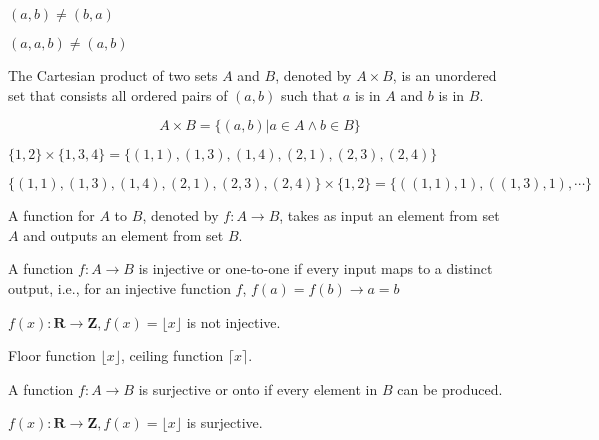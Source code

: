 \begin{ex}
$(a, b) \neq (b, a)$
\end{ex}

\begin{ex}
$(a, a, b) \neq (a, b)$
\end{ex}

\begin{defn}
The Cartesian product of two sets $A$ and $B$, denoted by $A \times B$, is an unordered set that consists all ordered pairs of $(a, b)$ such that $a$ is in $A$ and $b$ is in $B$.

$$A \times B = \{ (a, b) | a \in A \land b \in B\}$$
\end{defn}

\begin{ex}
$\{1, 2\} \times \{1, 3, 4\} = \{(1, 1), (1, 3), (1, 4), (2, 1), (2, 3), (2, 4) \}$
\end{ex}

\begin{ex}
$\{(1, 1), (1, 3), (1, 4), (2, 1), (2, 3), (2, 4) \} \times \{1, 2\} = \{((1, 1), 1), ((1, 3), 1), \cdots\}$
\end{ex}

\begin{defn}
A function for $A$ to $B$, denoted by $f: A \rightarrow B$, takes as input an element from set $A$ and outputs an element from set $B$.
\end{defn}

\begin{defn}
A function $f: A \rightarrow B$ is injective or one-to-one if every input maps to a distinct output, i.e., for an injective function $f$, $f(a) = f(b) \rightarrow a = b$
\end{defn}

\begin{ex}
$f(x): \mathbf{R} \rightarrow \mathbf{Z}, f(x) = \lfloor x \rfloor$ is not injective.
\end{ex}

\begin{remark}
Floor function $\lfloor x \rfloor$, ceiling function $\lceil x \rceil$.
\end{remark}

\begin{defn}
A function $f: A \rightarrow B$ is surjective or onto if every element in $B$ can be produced.
\end{defn}

\begin{ex}
$f(x): \mathbf{R} \rightarrow \mathbf{Z}, f(x) = \lfloor x \rfloor$ is surjective.
\end{ex}

